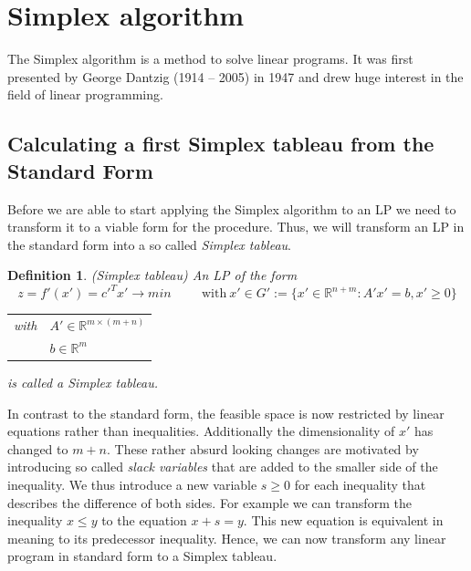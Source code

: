 \documentclass[a4paper, 11pt]{article}
\makeatletter
\newtheorem{mydef}{Definition}
\renewenvironment{quotation}
{\list{}{\listparindent=1.5em
		\itemindent=0pt
		\parsep\z@ \@plus\p@}%
	\item\relax}
{\endlist}
\makeatother
\begin{document}
\section{Simplex algorithm}

The Simplex algorithm is a method to solve linear programs. It was first presented by George Dantzig (1914 -- 2005) in 1947 and drew huge interest in the field of linear programming. 

\subsection{Calculating a first Simplex tableau from the Standard Form}
Before we are able to start applying the Simplex algorithm to an LP we need to transform it to a viable form for the procedure. Thus, we will transform an LP in the standard form into a so called \textit{Simplex tableau}. 
\begin{mydef}(Simplex tableau)\medskip
	An LP of the form
	\begin{equation}
		\label{tableau definition}
		z = f'(x') = c'^T  x' \rightarrow min
		\hspace{1cm} \text{with}\ x' \in G':=\{ x' \in \mathbb{R}^{n+m}: A'x' = b, x' \geq 0\}
	\end{equation}
	\begin{quotation}
		\begin{tabular}{rl}
			with &$ A'\in \mathbb{R}^{m\times (m+n)} $\\
			&$ b\in \mathbb{R}^m $
		\end{tabular}
	\end{quotation}
	is called a \emph{Simplex tableau}.
\end{mydef}

In contrast to the standard form, the feasible space is now restricted by linear equations rather than inequalities. Additionally the dimensionality of $x'$ has changed to $m+n$. These rather absurd looking changes are motivated by introducing so called \textit{slack variables} that are added to the smaller side of the inequality. We thus introduce a new variable $s\geq 0$ for each inequality that describes the difference of both sides. For example we can transform the inequality $x\leq y$ to the equation $x + s=y$. This new equation is equivalent in meaning to its predecessor inequality. Hence, we can now transform any linear program in standard form to a Simplex tableau.\medskip
\end{document}
